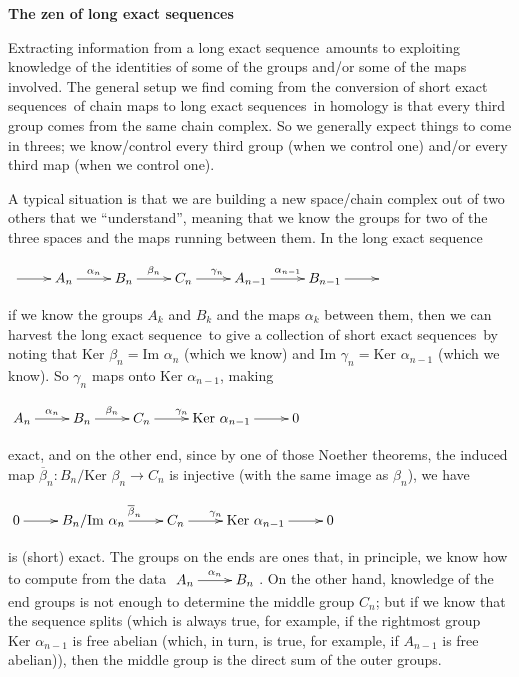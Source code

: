 \documentclass[12pt]{article}
\def\ctln{\centerline}
\def\nidt{\noindent}
\def\msk{\medskip}
\def\bsk{\bigskip}
\def\ssk{\smallskip}
\def\ra{\rightarrow}
\def\im{\textrm{Im }}
\def\krr{\textrm{Ker }}
\def\sxss{short exact sequences}
\def\lxs{long exact sequence}
\def\lxss{long exact sequences}
\begin{document}
\ctln{\bf The zen of long exact sequences}


\bsk

Extracting information from a \lxs\ amounts to exploiting knowledge
of the identities of some of the groups and/or some of the maps involved.
The general setup we find coming from the conversion of \sxss\
of chain maps to \lxss\ in homology is that every third group comes from the same chain complex.
So we generally expect things to come in threes; we know/control every third
group (when we control one) and/or every third map (when we control one).

\msk

A typical situation is that we are building a new space/chain complex out of two others
that we ``understand'', meaning that we know the groups for two of the three spaces 
and the maps running between them.
In the \lxs\

\ssk

\ctln{$\xymatrix{
\ar[r]&
A_n \ar[r]^{\alpha_n}&
B_n \ar[r]^{\beta_n} &
C_n \ar[r]^{\gamma_n}&
A_{n-1}\ar[r]^{\alpha_{n-1}}&
B_{n-1}\ar[r]&
}$}

\ssk

\nidt if we know the groups $A_k$ and $B_k$ and the maps $\alpha_k$ between them,
then we can harvest the \lxs\ to give a collection of \sxss\ by noting that
$\krr \beta_n = \im \alpha_n$ (which we know) and $\im \gamma_n = \krr \alpha_{n-1}$
(which we know). So $\gamma_n$ maps onto $\krr \alpha_{n-1}$, making

\ssk

\ctln{$\xymatrix{
A_n \ar[r]^{\alpha_n}&
B_n \ar[r]^{\beta_n} &
C_n \ar[r]^{\gamma_n}&
\krr {\alpha_{n-1}} \ar[r]&
0
}$}

\ssk

\nidt exact, and on the other end, since by one of those Noether theorems, 
the induced map $\overline{\beta}_n:B_n/\krr\beta_n\ra C_n$ is injective
(with the same image as $\beta_n$), we have

\ssk

\ctln{$\xymatrix{
0 \ar[r]&
B_n/\im \alpha_n \ar[r]^{\overline{\beta}_n} &
C_n \ar[r]^{\gamma_n}&
\krr {\alpha_{n-1}} \ar[r]&
0
}$}

\ssk

\nidt is (short) exact. The groups on the ends are ones that, in principle, we know how to compute from the data
$\xymatrix{A_n \ar[r]^{\alpha_n}&B_n}$. On the other hand, knowledge of the end groups is not
enough to determine the middle group $C_n$; but if we know that the sequence 
splits (which is always true, for example, if the rightmost group $\krr {\alpha_{n-1}}$ is free
abelian (which, in turn, is true, for example, if $A_{n-1}$ is free abelian)), then the middle
group is the direct sum of the outer groups.
\end{document}
